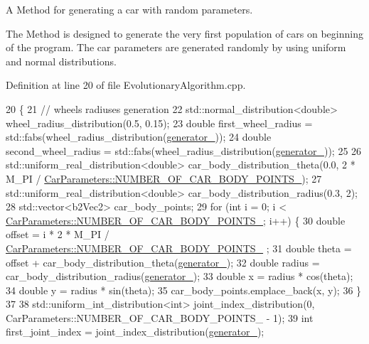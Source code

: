 A Method for generating a car with random parameters. 

The Method is designed to generate the very first population of cars on beginning of the program. The car parameters are generated randomly by using uniform and normal distributions. 

Definition at line 20 of file Evolutionary\+Algorithm.\+cpp.


\begin{DoxyCode}
20                                                                    \{
21     \textcolor{comment}{// wheels radiuses generation}
22     std::normal\_distribution<double> wheel\_radius\_distribution(0.5, 0.15);
23     \textcolor{keywordtype}{double} first\_wheel\_radius = std::fabs(wheel\_radius\_distribution(\hyperlink{classEvolutionaryAlgorithm_adbd823d385ad95bf20496fd2fc25ccde}{generator\_}));
24     \textcolor{keywordtype}{double} second\_wheel\_radius = std::fabs(wheel\_radius\_distribution(\hyperlink{classEvolutionaryAlgorithm_adbd823d385ad95bf20496fd2fc25ccde}{generator\_}));
25 
26     std::uniform\_real\_distribution<double> car\_body\_distribution\_theta(0.0, 2 * M\_PI / 
      \hyperlink{classCarParameters_a9cd45ac0f506d33d551c86eff1e0fa05}{CarParameters::NUMBER\_OF\_CAR\_BODY\_POINTS\_});
27     std::uniform\_real\_distribution<double> car\_body\_distribution\_radius(0.3, 2);
28     std::vector<b2Vec2> car\_body\_points;
29     \textcolor{keywordflow}{for} (\textcolor{keywordtype}{int} i = 0; i < \hyperlink{classCarParameters_a9cd45ac0f506d33d551c86eff1e0fa05}{CarParameters::NUMBER\_OF\_CAR\_BODY\_POINTS\_};
       i++) \{
30         \textcolor{keywordtype}{double} offset = i * 2 * M\_PI / \hyperlink{classCarParameters_a9cd45ac0f506d33d551c86eff1e0fa05}{CarParameters::NUMBER\_OF\_CAR\_BODY\_POINTS\_}
      ;
31         \textcolor{keywordtype}{double} theta = offset + car\_body\_distribution\_theta(\hyperlink{classEvolutionaryAlgorithm_adbd823d385ad95bf20496fd2fc25ccde}{generator\_});
32         \textcolor{keywordtype}{double} radius = car\_body\_distribution\_radius(\hyperlink{classEvolutionaryAlgorithm_adbd823d385ad95bf20496fd2fc25ccde}{generator\_});
33         \textcolor{keywordtype}{double} x = radius * cos(theta);
34         \textcolor{keywordtype}{double} y = radius * sin(theta);
35         car\_body\_points.emplace\_back(x, y);
36     \}
37 
38     std::uniform\_int\_distribution<int> joint\_index\_distribution(0, 
      CarParameters::NUMBER\_OF\_CAR\_BODY\_POINTS\_ - 1);
39     \textcolor{keywordtype}{int} first\_joint\_index = joint\_index\_distribution(\hyperlink{classEvolutionaryAlgorithm_adbd823d385ad95bf20496fd2fc25ccde}{generator\_});

\end{DoxyCode}
